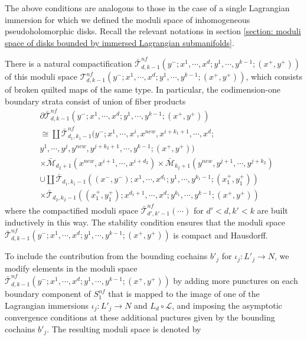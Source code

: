 \documentclass{amsart}
\numberwithin{equation}{section}
\numberwithin{figure}{section}
\begin{document}
	The above conditions are analogous to those in the case of a single Lagrangian immersion for which we defined the moduli space of inhomogeneous pseudoholomorphic disks. Recall the relevant notations in section \ref{section: moduli space of disks bounded by immersed Lagrangian submanifolds}. \par
	There is a natural compactification $\bar{\mathcal{T}}^{nf}_{d, k-1}(y^{-}; x^{1}, \cdots, x^{d}; y^{1}, \cdots, y^{k-1}; (x^{+}, y^{+}))$ of this moduli space $\mathcal{T}^{nf}_{d, k-1}(y^{-}; x^{1}, \cdots, x^{d}; y^{1}, \cdots, y^{k-1}; (x^{+}, y^{+}))
$, which consists of broken quilted maps of the same type. In particular, the codimension-one boundary strata consist of union of fiber products
\begin{equation}
\begin{split}
&\partial \bar{\mathcal{T}}^{nf}_{d, k-1}(y^{-}; x^{1}, \cdots, x^{d}; y^{1}, \cdots, y^{k-1}; (x^{+}, y^{+}))\\
& \cong \coprod \bar{\mathcal{T}}^{nf}_{d_{1}, k_{1}-1}(y^{-}; x^{1}, \cdots, x^{i}, x^{new}, x^{i+k_{1}+1}, \cdots, x^{d}; \\
& y^{1}, \cdots, y^{j}, y^{new}, y^{j+k_{2}+1}, \cdots, y^{k-1}; (x^{+}, y^{+}))\\
& \times \bar{\mathcal{M}}_{d_{2}+1}(x^{new}, x^{i+1}, \cdots, x^{i+d_{2}}) \times \bar{\mathcal{M}}_{k_{2}+1}(y^{new}, y^{j+1}, \cdots, y^{j+k_{2}})\\
& \cup \coprod \bar{\mathcal{T}}_{d_{1}, k_{1}-1}((x^{-}, y^{-}); x^{1}, \cdots, x^{d_{1}}; y^{1}, \cdots, y^{k_{1}-1}; (x^{+}_{1}, y^{+}_{1}))\\
& \times \bar{\mathcal{T}}_{d_{2}, k_{2}-1}((x^{+}_{1}, y^{+}_{1}); x^{d_{1}+1}, \cdots, x^{d}; y^{k_{1}}, \cdots, y^{k-1}; (x^{+}, y^{+}))
\end{split}
\end{equation}
where the compactified moduli space $\bar{\mathcal{T}}^{nf}_{d', k'-1}(\cdots)$ for $d' < d, k' < k$ are built inductively in this way.
The stability condition ensures that the moduli space $\bar{\mathcal{T}}^{nf}_{d, k-1}(y^{-}; x^{1}, \cdots, x^{d}; y^{1}, \cdots, y^{k-1}; (x^{+}, y^{+}))
$ is compact and Hausdorff. \par
	To include the contribution from the bounding cochains $b'_{j}$ for $\iota_{j}: L'_{j} \to N$, we modify elements in the moduli space $\bar{\mathcal{T}}^{nf}_{d, k-1}(y^{-}; x^{1}, \cdots, x^{d}; y^{1}, \cdots, y^{k-1}; (x^{+}, y^{+}))$ by adding more punctures on each boundary component of $S^{nf}_{1}$ that is mapped to the image of one of the Lagrangian immersions $\iota_{j}: L'_{j} \to N$ and $L_{d} \circ \mathcal{L}$, and imposing the asymptotic convergence conditions at these additional puctures given by the bounding cochains $b'_{j}$. The resulting moduli space is denoted by
\end{document}
